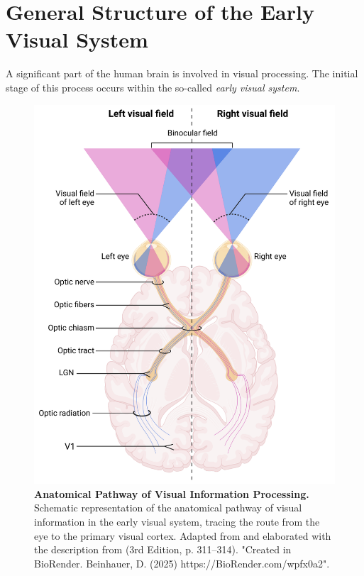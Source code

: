 \section{General Structure of the Early Visual System}
\label{sec:general_structure}

A significant part of the human brain is involved in visual processing. The initial stage of this process occurs within the so-called \emph{early visual system}.

\begin{figure}
    \centering
    \includegraphics[width=0.6\linewidth]{img/visual_pathway.pdf}
    \caption{\textbf{Anatomical Pathway of Visual Information Processing.} Schematic representation of the anatomical pathway of visual information in the early visual system, tracing the route from the eye to the primary visual cortex. Adapted from \citet{yaramothu2014short} and elaborated with the description from \citet{bear2020neuroscience} (3rd Edition, p. 311--314). "Created in BioRender. Beinhauer, D. (2025) https://BioRender.com/wpfx0a2".}
    \label{fig:visual_system_pathway}
\end{figure}


